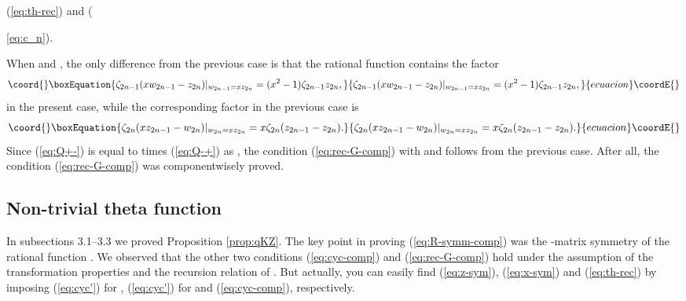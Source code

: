 \documentclass[a4paper,10pt]{article}
\begin{document}
(\ref{eq:th-rec}) and ({\ref{eq:c_n}). 

When \coordHE{} and \coordHE{}, the only difference 
from the previous case is that the rational function 
\coordHE{} contains the factor 
\begin{equation}\coord{}\boxEquation{
\zeta_{2n-1} (xw_{2n-1}-z_{2n})|_{w_{2n-1}=xz_{2n}}=
(x^2 -1)\zeta_{2n-1}z_{2n}, 
\label{eq:Q+-}
}{
\zeta_{2n-1} (xw_{2n-1}-z_{2n})|_{w_{2n-1}=xz_{2n}}=
(x^2 -1)\zeta_{2n-1}z_{2n}, 
}{ecuacion}\coordE{}\end{equation}
in the present case, while the corresponding factor 
in the previous case is 
\begin{equation}\coord{}\boxEquation{
\zeta_{2n} (xz_{2n-1}-w_{2n})|_{w_{2n}=xz_{2n}}= 
x\zeta_{2n} (z_{2n-1}-z_{2n}). 
\label{eq:Q-+}
}{
\zeta_{2n} (xz_{2n-1}-w_{2n})|_{w_{2n}=xz_{2n}}= 
x\zeta_{2n} (z_{2n-1}-z_{2n}). 
}{ecuacion}\coordE{}\end{equation}
Since (\ref{eq:Q+-}) is equal to \myHighlight{$\epsilon$}\coordHE{} times 
(\ref{eq:Q-+}) as 
\coordHE{}, the condition 
(\ref{eq:rec-G-comp}) with \coordHE{} 
and \coordHE{} follows from the previous 
case. After all, the condition 
(\ref{eq:rec-G-comp}) was componentwisely proved. 

\subsection{Non-trivial theta function}

In subsections 3.1--3.3 we proved Proposition 
\ref{prop:qKZ}. The key point in proving 
(\ref{eq:R-symm-comp}) was the \coordHE{}-matrix 
symmetry of the rational function 
\coordHE{}. We observed that 
the other two conditions (\ref{eq:cyc-comp}) and 
(\ref{eq:rec-G-comp}) hold under the assumption of 
the transformation properties and 
the recursion relation of \coordHE{}. 
But actually, you can easily find (\ref{eq:z-sym}), 
(\ref{eq:x-sym}) and (\ref{eq:th-rec}) by 
imposing (\ref{eq:cyc'}) for \coordHE{}, 
(\ref{eq:cyc'}) for \coordHE{} and 
(\ref{eq:cyc-comp}), respectively. 

}
\end{document}
